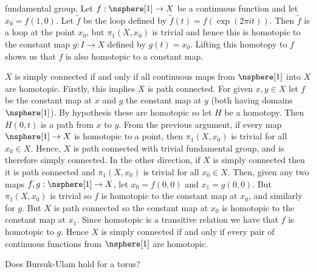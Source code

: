 \begin{solution}
        fundamental group. Let $f:\nsphere[1]\rightarrow{X}$ be a continuous
        function and let $x_{0}=f(1,0)$. Let $\tilde{f}$ be the loop defined by
        $\tilde{f}(t)=f(\exp(2\pi{i}t))$. Then $\tilde{f}$ is a loop at the
        point $x_{0}$, but $\pi_{1}(X,x_{0})$ is trivial and hence this is
        homotopic to the constant map $g:I\rightarrow{X}$ defined by
        $g(t)=x_{0}$. Lifting this homotopy to $f$ shows us that $f$ is also
        homotopic to a constant map.
        \par\hfill\par
        $X$ is simply connected if and only if all continuous maps from
        $\nsphere[1]$ into $X$ are homotopic. Firstly, this implies $X$ is
        path connected. For given $x,y\in{X}$ let $f$ be the constant map at
        $x$ and $g$ the constant map at $y$ (both having domains $\nsphere[1]$).
        By hypothesis these are homotopic so let $H$ be a homotopy. Then
        $H(0,t)$ is a path from $x$ to $y$. From the previous argument, if every
        map $\nsphere[1]\rightarrow{X}$ is homotopic to a point, then
        $\pi_{1}(X,x_{0})$ is trivial for all $x_{0}\in{X}$. Hence, $X$ is path
        connected with trivial fundamental group, and is therefore simply
        connected. In the other direction, if $X$ is simply connected then it is
        path connected and $\pi_{1}(X,x_{0})$ is trivial for all $x_{0}\in{X}$.
        Then, given any two maps $f,g:\nsphere[1]\rightarrow{X}$, let
        $x_{0}=f(0,0)$ and $x_{1}=g(0,0)$. But $\pi_{1}(X,x_{0})$ is trivial so
        $f$ is homotopic to the constant map at $x_{0}$, and similarly for
        $g$. But $X$ is path connected so the constant map at $x_{0}$ is
        homotopic to the constant map at $x_{1}$. Since homotopic is a
        transitive relation we have that $f$ is homotopic to $g$. Hence $X$ is
        simply connected if and only if every pair of continuous functions
        from $\nsphere[1]$ are homotopic.
    \end{solution}
    \begin{problem}
        Does Bursuk-Ulam hold for a torus?
    \end{problem}
